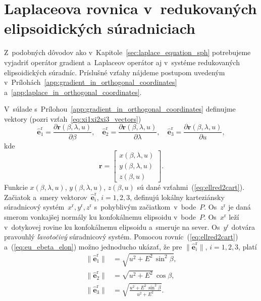 \documentclass[a4paper, 12pt]{book}
\let\vec\mathbf
\begin{document}
\section{Laplaceova rovnica v~redukovaných elipsoidických súradniciach}
\label{sec:laplace_in_reduced_ell_coords}

Z~podobných dôvodov ako v~Kapitole~\ref{sec:laplace_equation_sph} potrebujeme 
vyjadriť operátor gradient a~Laplaceov operátor aj v~systéme redukovaných 
elipsoidických súradníc.  Príslušné vzťahy nájdeme postupom uvedeným 
v~Prílohách~\ref{app:gradient_in_orthogonal_coordinates} 
a~\ref{app:laplace_in_orthogonal_coordinates}.

V~súlade s~Prílohou~\ref{app:gradient_in_orthogonal_coordinates} definujme 
vektory (pozri vzťah~\ref{eq:xi1xi2xi3_vectors})
%
\begin{equation}
\label{eq:eu_ebeta_elon}
\hat{\vec e}_1^\mathrm{r} = \frac{\partial \vec r(\beta, \lambda, u)}{\partial 
\beta}{,}
%
\quad
%
\hat{\vec e}_2^\mathrm{r} = \frac{\partial \vec r(\beta, \lambda, u)}{\partial 
\lambda}{,}
%
\quad
%
\hat{\vec e}_3^\mathrm{r} = \frac{\partial \vec r(\beta, \lambda, u)}{\partial 
u}{,}
%
\end{equation}
%
kde
%
\begin{equation}
\vec r =
%
\begin{bmatrix}
x(\beta, \lambda, u)\\
y(\beta, \lambda, u)\\
z(\beta, u)
\end{bmatrix}
{.}
%
\end{equation}
%
Funkcie $x(\beta, \lambda, u)$, $y(\beta, \lambda, u)$, $z(\beta, u)$ sú dané 
vzťahmi~(\ref{eq:ellred2cart}).  Začiatok a~smery vektorov~$\hat{\vec 
e}_i^\mathrm{r}$, $i = 1, 2, 3$, definujú lokálny karteziánsky súradnicový 
systém~$x^\mathrm{r}, y^\mathrm{r}, z^\mathrm{r}$ s~pohyblivým 
začiatkom~v~bode~$P$.  Os~$z^\mathrm{r}$ je daná smerom vonkajšej normály ku 
konfokálnemu elipsoidu v~bode~$P$.  Os~$x^\mathrm{r}$ leží v~dotykovej rovine 
ku konfokálnemu elipsoidu a~smeruje na sever.  Os~$y^\mathrm{r}$ dotvára 
pravouhlý \emph{ľavotočivý} súradnicový systém.
%
Pomocou rovníc~(\ref{eq:ellred2cart}) a~(\ref{eq:eu_ebeta_elon}) možno 
jednoducho ukázať, že pre $\| \hat{\vec e}_i^\mathrm{r} \|$, $i = 1, 2, 3$, 
platí
%
\begin{equation}
\label{eq:ei_reduced_ell_magnitudes}
\begin{split}
\| \hat{\vec e}_1^\mathrm{r} \| &= \sqrt{u^2 + E^2 \, \sin^2\beta}{,}\\
%
\| \hat{\vec e}_2^\mathrm{r} \| &= \sqrt{ u^2 + E^2} \, \cos\beta{,}\\
%
\| \hat{\vec e}_3^\mathrm{r} \| &= \sqrt{\frac{u^2 + E^2 \, \sin^2\beta}{u^2 
+ E^2}}{.}
\end{split}
\end{equation}
\end{document}
